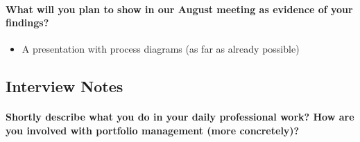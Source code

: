 \paragraph{What will you plan to show in our August meeting as evidence of your findings?}
\begin{itemize}
  \item A presentation with process diagrams (as far as already possible)
\end{itemize}




\subsection{Interview Notes}

\paragraph{Shortly describe what you do in your daily professional work? How are you involved with portfolio management (more concretely)?}
